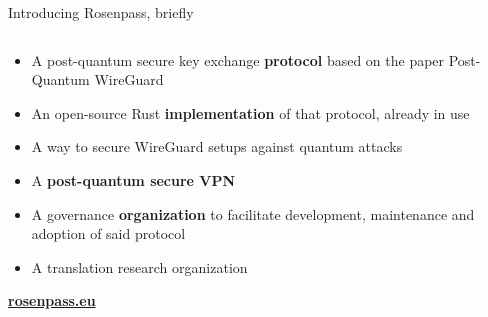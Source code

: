 \begin{frame}{Introducing Rosenpass, briefly}
\hypertarget{rosenpass-introduction}{}
  \begin{columns}[fullwidth,c]

    \begin{column}{.5\linewidth}
      \begin{itemize}
        \item A post-quantum secure key exchange \textbf{protocol}
          {\small based on the paper Post-Quantum WireGuard\citePqwg}
        \item An open-source Rust \textbf{implementation} of that protocol, already in use
        \item A way to secure WireGuard setups against quantum attacks
        \item A \textbf{post-quantum secure VPN}
        \item A governance \textbf{organization} to facilitate development, maintenance and adoption of said protocol
        \item A translation research organization
      \end{itemize}
      \vspace{2em}
      \textbf{\href{https://rosenpass.eu}{rosenpass.eu}}
    \end{column}%


  \end{columns}
\end{frame}
